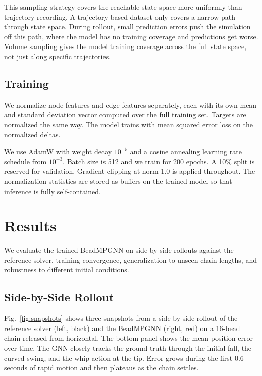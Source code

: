 \documentclass[conference]{IEEEtran}
\begin{document}
This sampling strategy covers the reachable state space more uniformly than trajectory recording. A trajectory-based dataset only covers a narrow path through state space. During rollout, small prediction errors push the simulation off this path, where the model has no training coverage and predictions get worse. Volume sampling gives the model training coverage across the full state space, not just along specific trajectories.

\subsection{Training}

We normalize node features and edge features separately, each with its own mean and standard deviation vector computed over the full training set. Targets are normalized the same way. The model trains with mean squared error loss on the normalized deltas.

We use AdamW with weight decay $10^{-5}$ and a cosine annealing learning rate schedule from $10^{-3}$. Batch size is 512 and we train for 200 epochs. A 10\% split is reserved for validation. Gradient clipping at norm 1.0 is applied throughout. The normalization statistics are stored as buffers on the trained model so that inference is fully self-contained.

\section{Results}

We evaluate the trained BeadMPGNN on side-by-side rollouts against the reference solver, training convergence, generalization to unseen chain lengths, and robustness to different initial conditions.

\subsection{Side-by-Side Rollout}

Fig.~\ref{fig:snapshots} shows three snapshots from a side-by-side rollout of the reference solver (left, black) and the BeadMPGNN (right, red) on a 16-bead chain released from horizontal. The bottom panel shows the mean position error over time. The GNN closely tracks the ground truth through the initial fall, the curved swing, and the whip action at the tip. Error grows during the first 0.6 seconds of rapid motion and then plateaus as the chain settles.
\end{document}
